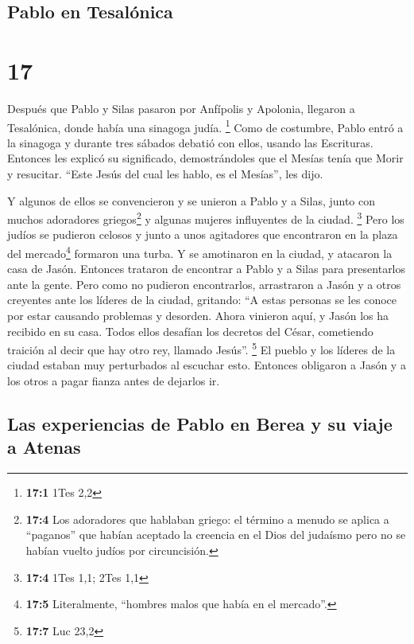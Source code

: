 \hypertarget{pablo-en-tesaluxf3nica}{%
\subsection{Pablo en Tesalónica}\label{pablo-en-tesaluxf3nica}}

\hypertarget{section-16}{%
\section{17}\label{section-16}}

 Después que Pablo y Silas pasaron por Anfípolis y
Apolonia, llegaron a Tesalónica, donde había una sinagoga judía.
\footnote{\textbf{17:1} 1Tes 2,2}  Como de costumbre,
Pablo entró a la sinagoga y durante tres sábados debatió con ellos,
usando las Escrituras.  Entonces les explicó su
significado, demostrándoles que el Mesías tenía que Morir y resucitar.
``Este Jesús del cual les hablo, es el Mesías'', les dijo.

 Y algunos de ellos se convencieron y se unieron a Pablo y
a Silas, junto con muchos adoradores griegos\footnote{\textbf{17:4} Los
  adoradores que hablaban griego: el término a menudo se aplica a
  ``paganos'' que habían aceptado la creencia en el Dios del judaísmo
  pero no se habían vuelto judíos por circuncisión.} y algunas mujeres
influyentes de la ciudad. \footnote{\textbf{17:4} 1Tes 1,1; 2Tes 1,1}
 Pero los judíos se pudieron celosos y junto a unos
agitadores que encontraron en la plaza del mercado\footnote{\textbf{17:5}
  Literalmente, ``hombres malos que había en el mercado''.} formaron una
turba. Y se amotinaron en la ciudad, y atacaron la casa de Jasón.
Entonces trataron de encontrar a Pablo y a Silas para presentarlos ante
la gente.  Pero como no pudieron encontrarlos, arrastraron
a Jasón y a otros creyentes ante los líderes de la ciudad, gritando: ``A
estas personas se les conoce por estar causando problemas y desorden.
Ahora vinieron aquí,  y Jasón los ha recibido en su casa.
Todos ellos desafían los decretos del César, cometiendo traición al
decir que hay otro rey, llamado Jesús''. \footnote{\textbf{17:7} Luc
  23,2}  El pueblo y los líderes de la ciudad estaban muy
perturbados al escuchar esto.  Entonces obligaron a Jasón
y a los otros a pagar fianza antes de dejarlos ir.

\hypertarget{las-experiencias-de-pablo-en-berea-y-su-viaje-a-atenas}{%
\subsection{Las experiencias de Pablo en Berea y su viaje a
Atenas}\label{las-experiencias-de-pablo-en-berea-y-su-viaje-a-atenas}}

